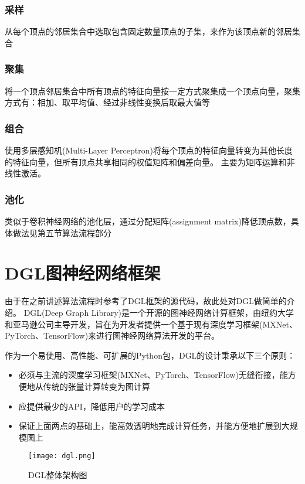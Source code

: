 \subsubsection{采样}
从每个顶点的邻居集合中选取包含固定数量顶点的子集，来作为该顶点新的邻居集合

\subsubsection{聚集}
将一个顶点邻居集合中所有顶点的特征向量按一定方式聚集成一个顶点向量，聚集方式有：相加、取平均值、经过非线性变换后取最大值等

\subsubsection{组合}
使用多层感知机(Multi-Layer Perceptron)将每个顶点的特征向量转变为其他长度的特征向量，但所有顶点共享相同的权值矩阵和偏差向量。
主要为矩阵运算和非线性激活。

\subsubsection{池化}
类似于卷积神经网络的池化层，通过分配矩阵(assignment matrix)降低顶点数，具体做法见第五节算法流程部分

\section{DGL图神经网络框架}
由于在之前讲述算法流程时参考了DGL框架的源代码，故此处对DGL做简单的介绍。
DGL(Deep Graph Library)是一个开源的图神经网络计算框架，由纽约大学和亚马逊公司主导开发，旨在为开发者提供一个基于现有深度学习框架(MXNet、PyTorch、TensorFlow)来进行图神经网络算法开发的平台。

作为一个易使用、高性能、可扩展的Python包，DGL的设计秉承以下三个原则：
\begin{itemize}
    \item 必须与主流的深度学习框架(MXNet、PyTorch、TensorFlow)无缝衔接，能方便地从传统的张量计算转变为图计算
    \item 应提供最少的API，降低用户的学习成本
    \item 保证上面两点的基础上，能高效透明地完成计算任务，并能方便地扩展到大规模图上
\end{itemize}

\begin{figure}[htb]
    \centering
    \texttt{[image: dgl.png]}
    \caption{DGL整体架构图}
\end{figure}

